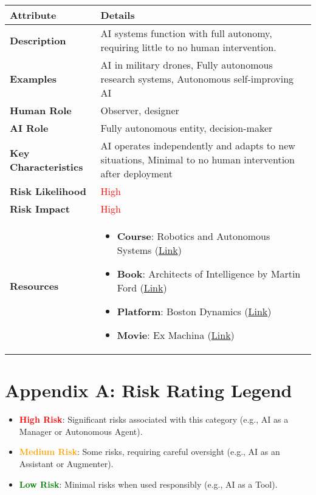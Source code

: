 \documentclass{article}
\begin{document}
\begin{longtable}{|p{4cm}|p{10cm}|}
\hline
\textbf{Attribute} & \textbf{Details} \\
\hline
\textbf{Description} & AI systems function with full autonomy, requiring little to no human intervention. \\
\hline
\textbf{Examples} & AI in military drones, Fully autonomous research systems, Autonomous self-improving AI \\
\hline
\textbf{Human Role} & Observer, designer \\
\hline
\textbf{AI Role} & Fully autonomous entity, decision-maker \\
\hline
\textbf{Key Characteristics} & AI operates independently and adapts to new situations, Minimal to no human intervention after deployment \\
\hline
\textbf{Risk Likelihood} & \textcolor{red}{High} \\
\hline
\textbf{Risk Impact} & \textcolor{red}{High} \\
\hline
\textbf{Resources} & \begin{itemize}
  \item \textbf{Course}: Robotics and Autonomous Systems (\href{https://www.udacity.com/course/robotics-and-autonomous-systems--nd209}{Link})
  \item \textbf{Book}: Architects of Intelligence by Martin Ford (\href{https://www.amazon.com/dp/1789954532}{Link})
  \item \textbf{Platform}: Boston Dynamics (\href{https://www.bostondynamics.com/}{Link})
  \item \textbf{Movie}: Ex Machina (\href{https://www.imdb.com/title/tt0470752/}{Link})
\end{itemize} \\ \hline
\end{longtable}

\newpage
\appendix
\section*{Appendix A: Risk Rating Legend}

\begin{itemize}
    \item \textbf{\textcolor{red}{High Risk}}: Significant risks associated with this category (e.g., AI as a Manager or Autonomous Agent).
    \item \textbf{\textcolor{orange}{Medium Risk}}: Some risks, requiring careful oversight (e.g., AI as an Assistant or Augmenter).
    \item \textbf{\textcolor{green}{Low Risk}}: Minimal risks when used responsibly (e.g., AI as a Tool).
\end{itemize}
\end{document}
